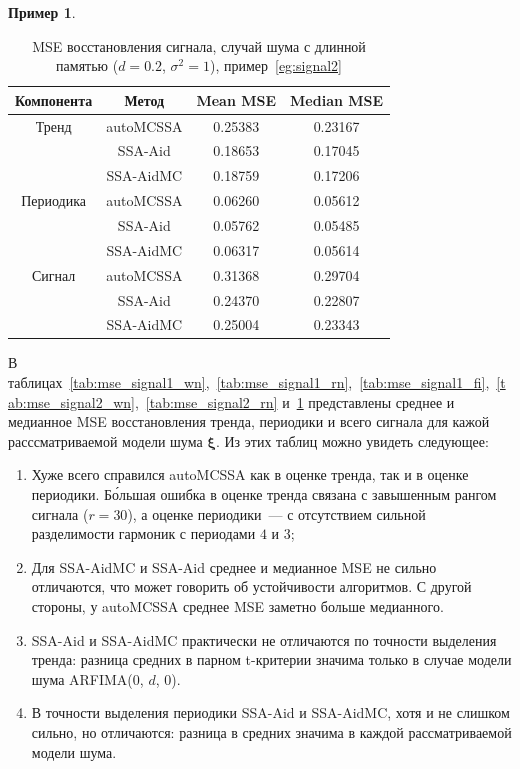 \documentclass[specialist,
substylefile = spbu_report.rtx,
subf,12pt]{disser}
\theoremstyle{definition}
\newtheorem{example}{Пример}[chapter]
\begin{document}
\begin{example}
	\begin{table}[h!]
        \centering
        \caption{MSE восстановления сигнала, случай шума с длинной памятью ($d=0.2$, $\sigma^2=1$), пример~\ref{eg:signal2}}
		\label{tab:mse_signal2_fi}
		\begin{tabular}{c|c|c|c}
			Компонента & Метод & Mean MSE & Median MSE \\
			\hline
			Тренд & autoMCSSA & 0.25383  & 0.23167 \\
			& SSA-Aid & 0.18653  & 0.17045 \\
			& SSA-AidMC & 0.18759  & 0.17206 \\
			\hline
			Периодика & autoMCSSA & 0.06260  & 0.05612 \\
			& SSA-Aid & 0.05762  & 0.05485 \\
			& SSA-AidMC & 0.06317  & 0.05614 \\
			\hline
			Сигнал & autoMCSSA & 0.31368  & 0.29704 \\
			& SSA-Aid & 0.24370  & 0.22807 \\
			& SSA-AidMC & 0.25004  & 0.23343 \\
			\hline
		\end{tabular}
    \end{table}
\end{example}

В таблицах~\ref{tab:mse_signal1_wn},~\ref{tab:mse_signal1_rn},~\ref{tab:mse_signal1_fi},~\ref{tab:mse_signal2_wn},~\ref{tab:mse_signal2_rn} и~\ref{tab:mse_signal2_fi} представлены среднее и медианное MSE восстановления тренда, периодики и всего сигнала для кажой расссматриваемой модели шума $\bm\xi$. Из этих таблиц можно увидеть следующее:
\begin{enumerate}
	\item Хуже всего справился autoMCSSA как в оценке тренда, так и в оценке периодики. Б\'{о}льшая ошибка в оценке тренда связана с завышенным рангом сигнала ($r=30$), а оценке периодики~--- с отсутствием сильной разделимости гармоник с периодами $4$ и $3$;
	\item Для SSA-AidMC и SSA-Aid среднее и медианное MSE не сильно отличаются, что может говорить об устойчивости алгоритмов. С другой стороны, у autoMCSSA среднее MSE заметно больше медианного.
	\item SSA-Aid и SSA-AidMC практически не отличаются по точности выделения тренда: разница средних в парном t-критерии значима только в случае модели шума ARFIMA(0, $d$, 0).  
	\item В точности выделения периодики SSA-Aid и SSA-AidMC, хотя и не слишком сильно, но отличаются: разница в средних значима в каждой рассматриваемой модели шума.
\end{enumerate}
\end{document}
